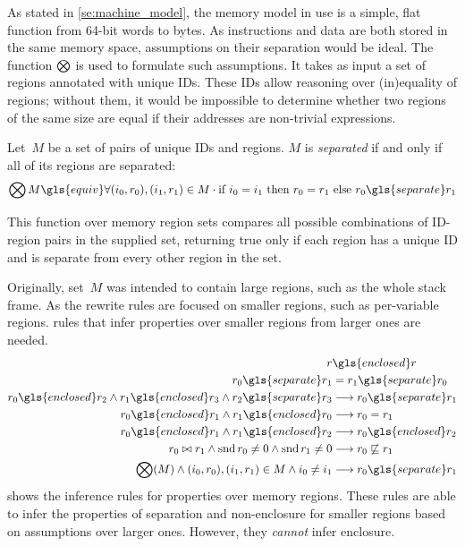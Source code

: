 As stated in \cref{se:machine_model}, the memory model in use is a simple,
flat function from 64-bit words to bytes.
As instructions and data are both stored in the same memory space,
assumptions on their separation would be ideal.
The function $\operatorname{\bigotimes}$ is used to formulate such assumptions.
It takes as input a set of regions annotated with unique IDs.
These IDs allow reasoning over (in)equality of regions; without them,
it would be impossible to determine whether two regions of the same size are equal
if their addresses are non-trivial expressions.
\begin{definition}[Separation]
  Let~$M$ be a set of pairs of unique IDs and regions.
  $M$ is \emph{separated} if and only if all of its regions are separated:
  \begin{equation}
    \seps M\gls{equiv}\forall(i_0,r_0),(i_1,r_1)\in M\cdot
    \text{if }i_0=i_1\text{ then }r_0=r_1\text{ else }r_0\gls{separate}r_1
  \end{equation}
\end{definition}
This function over memory region sets compares all possible combinations of
ID-region pairs in the supplied set, returning true only if each region
has a unique ID and is separate from every other region in the set.

Originally, set~$M$ was intended to contain large regions,
such as the whole stack frame.
As the rewrite rules are focused on smaller regions, such as per-variable regions.
rules that infer properties over smaller regions from larger ones are needed.
\begin{subequations}\label{rules_sep_enc}
  \begin{align}
    r &\gls{enclosed}r \\
    r_0\gls{separate}r_1 &= r_1\gls{separate}r_0 \\
    r_0\gls{enclosed}r_2\land r_1\gls{enclosed}r_3\land r_2\gls{separate}r_3 &\longrightarrow r_0\gls{separate}r_1 \\
    r_0\gls{enclosed}r_1\land r_1\gls{enclosed}r_0 &\longrightarrow r_0=r_1 \\
    r_0\gls{enclosed}r_1\land r_1\gls{enclosed}r_2 &\longrightarrow r_0\gls{enclosed}r_2 \\
    r_0\bowtie r_1\land\snd{r_0}\neq 0\land\snd{r_1}\neq 0 &\longrightarrow r_0 \not\sqsubseteq r_1 \\
    \seps(M)\land(i_0,r_0),(i_1,r_1)\in M\land i_0\neq i_1 &\longrightarrow r_0\gls{separate}r_1
  \end{align}
\end{subequations}
 shows the inference rules for properties over memory regions.
These rules are able to infer the properties of separation and non-enclosure
for smaller regions based on assumptions over larger ones.
However, they \emph{cannot} infer enclosure.

